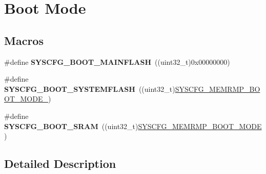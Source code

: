 \hypertarget{group___s_y_s_c_f_g___boot_mode}{\section{Boot Mode}
\label{group___s_y_s_c_f_g___boot_mode}
}
\subsection*{Macros}
\begin{DoxyCompactItemize}
\item 
\hypertarget{group___s_y_s_c_f_g___boot_mode_ga1cfa68f41fcdf064fe4f57424067581c}{\#define {\bfseries S\-Y\-S\-C\-F\-G\-\_\-\-B\-O\-O\-T\-\_\-\-M\-A\-I\-N\-F\-L\-A\-S\-H}~((uint32\-\_\-t)0x00000000)}\label{group___s_y_s_c_f_g___boot_mode_ga1cfa68f41fcdf064fe4f57424067581c}

\item 
\hypertarget{group___s_y_s_c_f_g___boot_mode_ga603891dcd1d145e4ffbaa2873181974a}{\#define {\bfseries S\-Y\-S\-C\-F\-G\-\_\-\-B\-O\-O\-T\-\_\-\-S\-Y\-S\-T\-E\-M\-F\-L\-A\-S\-H}~((uint32\-\_\-t)\hyperlink{group___peripheral___registers___bits___definition_gab3aac746e615c3eb9681d6561ca8b1d2}{S\-Y\-S\-C\-F\-G\-\_\-\-M\-E\-M\-R\-M\-P\-\_\-\-B\-O\-O\-T\-\_\-\-M\-O\-D\-E\-\_})}\label{group___s_y_s_c_f_g___boot_mode_ga603891dcd1d145e4ffbaa2873181974a}

\item 
\hypertarget{group___s_y_s_c_f_g___boot_mode_gab5f9d82b9c7af24984cb807d22ea0996}{\#define {\bfseries S\-Y\-S\-C\-F\-G\-\_\-\-B\-O\-O\-T\-\_\-\-S\-R\-A\-M}~((uint32\-\_\-t)\hyperlink{group___peripheral___registers___bits___definition_ga38d77b745bf303f4f353c7029591102b}{S\-Y\-S\-C\-F\-G\-\_\-\-M\-E\-M\-R\-M\-P\-\_\-\-B\-O\-O\-T\-\_\-\-M\-O\-D\-E})}\label{group___s_y_s_c_f_g___boot_mode_gab5f9d82b9c7af24984cb807d22ea0996}

\end{DoxyCompactItemize}


\subsection{Detailed Description}
